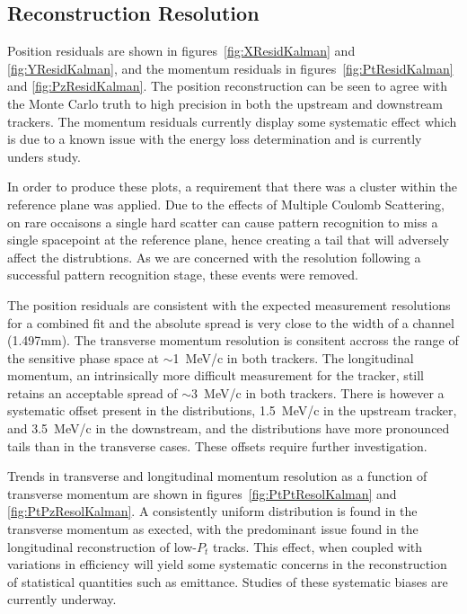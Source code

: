   \subsection{Reconstruction Resolution}
  \label{sec:performance:resolutions}
  
  Position residuals are shown in figures~\ref{fig:XResidKalman} and \ref{fig:YResidKalman}, and the momentum residuals in figures~\ref{fig:PtResidKalman} and \ref{fig:PzResidKalman}.  The position reconstruction can be seen to agree with the Monte Carlo truth to high precision in both the upstream and downstream trackers. The momentum residuals currently display some systematic effect which is due to a known issue with the energy loss determination and is currently unders study.
  
  In order to produce these plots, a requirement that there was a cluster within the reference plane was applied. Due to the effects of Multiple Coulomb Scattering, on rare occaisons a single hard scatter can cause pattern recognition to miss a single spacepoint at the reference plane, hence creating a tail that will adversely affect the distrubtions. As we are concerned with the resolution following a successful pattern recognition stage, these events were removed.
  
  The position residuals are consistent with the expected measurement resolutions for a combined fit and the absolute spread is very close to the width of a channel (1.497mm). The transverse momentum resolution is consitent accross the range of the sensitive phase space at $\sim$1~MeV/c in both trackers. The longitudinal momentum, an intrinsically more difficult measurement for the tracker, still retains an acceptable spread of $\sim3$~MeV/c in both trackers. There is however a systematic offset present in the distributions, 1.5~MeV/c in the upstream tracker, and 3.5~MeV/c in the downstream, and the distributions have more pronounced tails than in the transverse cases. These offsets require further investigation.
  
  Trends in transverse and longitudinal momentum resolution as a function of transverse momentum are shown in figures~\ref{fig:PtPtResolKalman} and \ref{fig:PtPzResolKalman}. A consistently uniform distribution is found in the transverse momentum as exected, with the predominant issue found in the longitudinal reconstruction of low-$P_t$ tracks. This effect, when coupled with variations in efficiency will yield some systematic concerns in the reconstruction of statistical quantities such as emittance. Studies of these systematic biases are currently underway.

